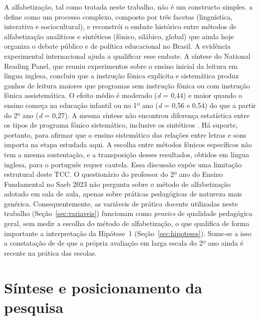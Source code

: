 A alfabetização, tal como tratada neste trabalho, não é um constructo
simples.  a define como um processo
complexo, composto por três facetas (linguística, interativa e
sociocultural), e reconstrói o embate histórico entre métodos de
alfabetização analíticos e sintéticos (fônico, silábico, global) que ainda
hoje organiza o debate público e de política educacional no Brasil. A
evidência experimental internacional ajuda a qualificar esse embate. A
síntese do National Reading Panel, que reuniu experimentos sobre o ensino
inicial da leitura em língua inglesa, concluiu que a instrução fônica
explícita e sistemática produz ganhos de leitura maiores que programas sem
instrução fônica ou com instrução fônica assistemática. O efeito médio é
moderado (\textit{d} = 0,44) e maior quando o ensino começa na educação
infantil ou no 1º ano (\textit{d} = 0,56 e 0,54) do que a partir do 2º ano
(\textit{d} = 0,27). A mesma síntese não encontrou diferença estatística
entre os tipos de programa fônico sistemático, inclusive os sintéticos
\cite[p.~2-92 e 2-93]{nrp2000}. Há suporte, portanto, para afirmar que o
ensino sistemático das relações entre letras e sons importa na etapa
estudada aqui. A escolha entre métodos fônicos específicos não tem a mesma
sustentação, e a transposição desses resultados, obtidos em língua
inglesa, para o português requer cautela. Essa
discussão expõe uma limitação estrutural deste TCC. O questionário do
professor do 2º ano
do Ensino Fundamental no Saeb 2023 não pergunta sobre o método de
alfabetização adotado em sala de aula, apenas sobre práticas pedagógicas
de natureza mais genérica. Consequentemente, as variáveis de prática
docente utilizadas neste trabalho (Seção~\ref{sec:variaveis}) funcionam
como \textit{proxies} de qualidade pedagógica geral, sem medir a escolha
do método de alfabetização, o que qualifica de
forma importante a interpretação da Hipótese~1 (Seção~\ref{sec:hipoteses}).
Some-se a isso a constatação de  de que a
própria avaliação em larga escala do 2º ano ainda é
recente na prática das escolas.

\section{Síntese e posicionamento da pesquisa}

